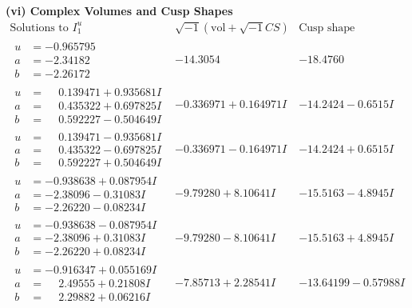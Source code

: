 \documentclass[1p]{elsarticle_modified}
\theoremstyle{definition}
\newcommand{\I}{\sqrt{-1}}
\begin{document}
\newpage\flushleft \textbf{(vi) Complex Volumes and Cusp Shapes}
$$\begin{array}{c|c|c}  
\text{Solutions to }I^u_{1}& \I (\text{vol} + \sqrt{-1}CS) & \text{Cusp shape}\\
 \hline 
\begin{aligned}
u &= -0.965795\phantom{ +0.000000I} \\
a &= -2.34182\phantom{ +0.000000I} \\
b &= -2.26172\phantom{ +0.000000I}\end{aligned}
 & -14.3054\phantom{ +0.000000I} & -18.4760\phantom{ +0.000000I} \\ \hline\begin{aligned}
u &= \phantom{-}0.139471 + 0.935681 I \\
a &= \phantom{-}0.435322 + 0.697825 I \\
b &= \phantom{-}0.592227 - 0.504649 I\end{aligned}
 & -0.336971 + 0.164971 I & -14.2424 - 0.6515 I \\ \hline\begin{aligned}
u &= \phantom{-}0.139471 - 0.935681 I \\
a &= \phantom{-}0.435322 - 0.697825 I \\
b &= \phantom{-}0.592227 + 0.504649 I\end{aligned}
 & -0.336971 - 0.164971 I & -14.2424 + 0.6515 I \\ \hline\begin{aligned}
u &= -0.938638 + 0.087954 I \\
a &= -2.38096 - 0.31083 I \\
b &= -2.26220 - 0.08234 I\end{aligned}
 & -9.79280 + 8.10641 I & -15.5163 - 4.8945 I \\ \hline\begin{aligned}
u &= -0.938638 - 0.087954 I \\
a &= -2.38096 + 0.31083 I \\
b &= -2.26220 + 0.08234 I\end{aligned}
 & -9.79280 - 8.10641 I & -15.5163 + 4.8945 I \\ \hline\begin{aligned}
u &= -0.916347 + 0.055169 I \\
a &= \phantom{-}2.49555 + 0.21808 I \\
b &= \phantom{-}2.29882 + 0.06216 I\end{aligned}
 & -7.85713 + 2.28541 I & -13.64199 - 0.57988 I \\ \hline\begin{aligned}

\end{aligned}
\end{array}$$
\end{document}
